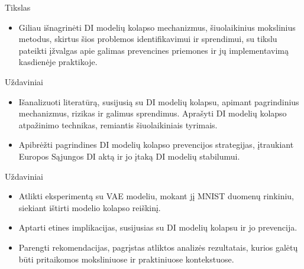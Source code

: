 \documentclass{beamer}
\begin{document}
\begin{frame}{Tikslas}
\begin{itemize}
    \item Giliau išnagrinėti DI modelių kolapso mechanizmus,  šiuolaikinius mokslinius metodus, skirtus šios problemos identifikavimui ir sprendimui, su tikslu pateikti įžvalgas apie galimas prevencines priemones ir jų implementavimą kasdienėje praktikoje.
\end{itemize}

\end{frame}


\begin{frame}{Uždaviniai}
\begin{itemize}
    \item Išanalizuoti literatūrą, susijusią su DI modelių kolapsu, apimant pagrindinius mechanizmus, rizikas ir galimus sprendimus. Aprašyti DI modelių kolapso atpažinimo technikas, remiantis šiuolaikiniais tyrimais.
    \item Apibrėžti pagrindines DI modelių kolapso prevencijos strategijas, įtraukiant Europos Sąjungos DI aktą ir jo įtaką DI modelių stabilumui.
\end{itemize}
\end{frame}

\begin{frame}{Uždaviniai}
\begin{itemize}
    \item Atlikti eksperimentą su VAE modeliu, mokant jį MNIST duomenų rinkiniu, siekiant ištirti modelio kolapso reiškinį.
    \\
    \item Aptarti etines implikacijas, susijusias su DI modelių kolapsu ir jo prevencija.
    \\
    \item Parengti rekomendacijas, pagrįstas atliktos analizės rezultatais, kurios galėtų būti pritaikomos moksliniuose ir praktiniuose kontekstuose.
\end{itemize}
\end{frame}
\end{document}
